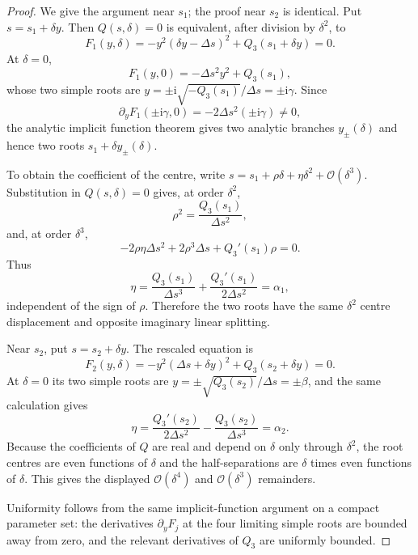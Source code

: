 \documentclass[11pt,a4paper]{article}
\theoremstyle{plain}
\theoremstyle{definition}
\theoremstyle{remark}
\newcommand{\ii}{\mathrm{i}}
\newcommand{\Oo}{\mathcal{O}}
\begin{document}
\begin{proof}
We give the argument near $s_1$; the proof near $s_2$ is identical.
Put $s=s_1+\delta y$.  Then $Q(s,\delta)=0$ is equivalent, after
division by $\delta^2$, to
\[
  F_1(y,\delta)
  =
  -y^2(\delta y-\Delta s)^2+Q_3(s_1+\delta y)
  =0 .
\]
At $\delta=0$,
\[
  F_1(y,0)=-\Delta s^2y^2+Q_3(s_1),
\]
whose two simple roots are
$y=\pm \ii\sqrt{-Q_3(s_1)}/\Delta s=\pm \ii\gamma$.
Since
\[
  \partial_yF_1(\pm \ii\gamma,0)
  =
  -2\Delta s^2(\pm \ii\gamma)\neq 0,
\]
the analytic implicit function theorem gives two analytic branches
$y_\pm(\delta)$ and hence two roots
$s_1+\delta y_\pm(\delta)$.

To obtain the coefficient of the centre, write
$s=s_1+\rho\delta+\eta\delta^2+\Oo(\delta^3)$.
Substitution in $Q(s,\delta)=0$ gives, at order $\delta^2$,
\[
  \rho^2=\frac{Q_3(s_1)}{\Delta s^2},
\]
and, at order $\delta^3$,
\[
  -2\rho\eta\Delta s^2+2\rho^3\Delta s+Q_3'(s_1)\rho=0 .
\]
Thus
\[
  \eta
  =
  \frac{Q_3(s_1)}{\Delta s^3}
  +\frac{Q_3'(s_1)}{2\Delta s^2}
  =\alpha_1,
\]
independent of the sign of $\rho$.  Therefore the two roots have
the same $\delta^2$ centre displacement and opposite imaginary
linear splitting.

Near $s_2$, put $s=s_2+\delta y$.  The rescaled equation is
\[
  F_2(y,\delta)
  =
  -y^2(\Delta s+\delta y)^2+Q_3(s_2+\delta y)=0 .
\]
At $\delta=0$ its two simple roots are
$y=\pm\sqrt{Q_3(s_2)}/\Delta s=\pm\beta$, and the same calculation
gives
\[
  \eta
  =
  \frac{Q_3'(s_2)}{2\Delta s^2}
  -\frac{Q_3(s_2)}{\Delta s^3}
  =\alpha_2 .
\]
Because the coefficients of $Q$ are real and depend on $\delta$
only through $\delta^2$, the root centres are even functions of
$\delta$ and the half-separations are $\delta$ times even functions
of $\delta$.  This gives the displayed
$\Oo(\delta^4)$ and $\Oo(\delta^3)$ remainders.

Uniformity follows from the same implicit-function argument on a
compact parameter set: the derivatives
$\partial_yF_j$ at the four limiting simple roots are bounded away
from zero, and the relevant derivatives of $Q_3$ are uniformly
bounded.
\end{proof}
\end{document}
